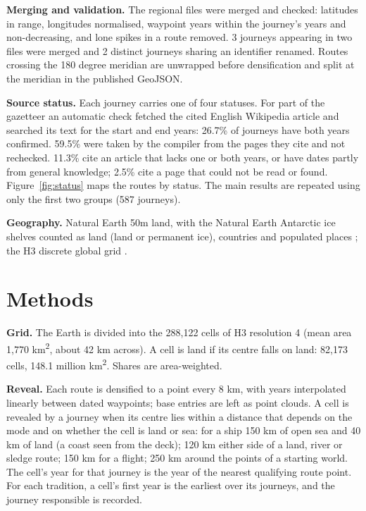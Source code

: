 \documentclass[11pt,a4paper]{article}
\begin{document}
\textbf{Merging and validation.} The regional files were merged and checked: latitudes in range, longitudes normalised, waypoint years within the journey's years and non-decreasing, and lone spikes in a route removed. 3 journeys appearing in two files were merged and 2 distinct journeys sharing an identifier renamed. Routes crossing the 180 degree meridian are unwrapped before densification and split at the meridian in the published GeoJSON.

\textbf{Source status.} Each journey carries one of four statuses. For part of the gazetteer an automatic check fetched the cited English Wikipedia article and searched its text for the start and end years: 26.7\% of journeys have both years confirmed. 59.5\% were taken by the compiler from the pages they cite and not rechecked. 11.3\% cite an article that lacks one or both years, or have dates partly from general knowledge; 2.5\% cite a page that could not be read or found. Figure~\ref{fig:status} maps the routes by status. The main results are repeated using only the first two groups (587 journeys).

\textbf{Geography.} Natural Earth 50m land, with the Natural Earth Antarctic ice shelves counted as land (land or permanent ice), countries and populated places \citep{naturalearth}; the H3 discrete global grid \citep{h3}.

\section{Methods}
\textbf{Grid.} The Earth is divided into the 288,122 cells of H3 resolution 4 (mean area 1,770 km\textsuperscript{2}, about 42 km across). A cell is land if its centre falls on land: 82,173 cells, 148.1 million km\textsuperscript{2}. Shares are area-weighted.

\textbf{Reveal.} Each route is densified to a point every 8 km, with years interpolated linearly between dated waypoints; base entries are left as point clouds. A cell is revealed by a journey when its centre lies within a distance that depends on the mode and on whether the cell is land or sea: for a ship 150 km of open sea and 40 km of land (a coast seen from the deck); 120 km either side of a land, river or sledge route; 150 km for a flight; 250 km around the points of a starting world. The cell's year for that journey is the year of the nearest qualifying route point. For each tradition, a cell's first year is the earliest over its journeys, and the journey responsible is recorded.
\end{document}
